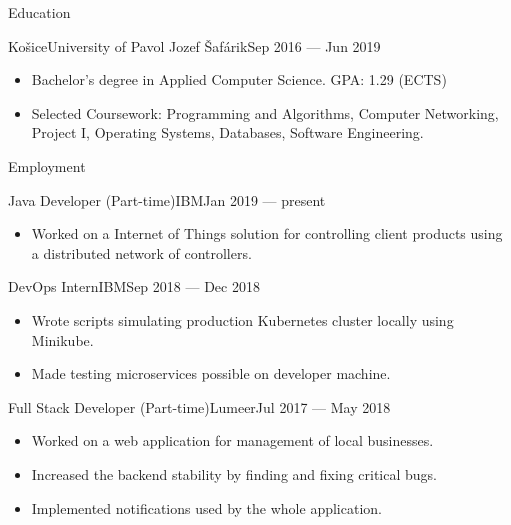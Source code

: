 \documentclass[]{style}
\begin{document}
	\makeheader
	
	\begin{cvsection}{Education}
		\begin{cvsubsection}{Košice}{University of Pavol Jozef Šafárik}{Sep 2016 — Jun 2019}
			\begin{itemize}
				\item Bachelor's degree in Applied Computer Science. GPA: 1.29 (ECTS)
				\item Selected Coursework: Programming and Algorithms, Computer Networking, Project I, Operating Systems, Databases, Software Engineering.
			\end{itemize}
		\end{cvsubsection}
	\end{cvsection}

	\begin{cvsection}{Employment}
		\begin{cvsubsection}{Java Developer (Part-time)}{IBM}{Jan 2019 — present}
			\begin{itemize}
			    \item Worked on a Internet of Things solution for controlling client products using a distributed network of controllers.
			\end{itemize}
		\end{cvsubsection}
	
    		\begin{cvsubsection}{DevOps Intern}{IBM}{Sep 2018 — Dec 2018}
			\begin{itemize}
			    \item Wrote scripts simulating production Kubernetes cluster locally using Minikube.
			    \item Made testing microservices possible on developer machine.
			\end{itemize}
		\end{cvsubsection}
		
		\begin{cvsubsection}{Full Stack Developer (Part-time)}{Lumeer}{Jul 2017 — May 2018}
			\begin{itemize}
				\item Worked on a web application for management of local businesses.
				\item Increased the backend stability by finding and fixing critical bugs.
				\item Implemented notifications used by the whole application.							
			\end{itemize}
		\end{cvsubsection}
	\end{cvsection}
	
\end{document}

